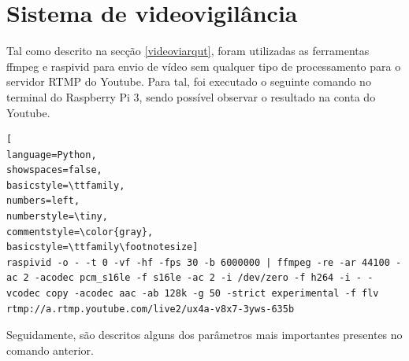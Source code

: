












\section{Sistema de videovigilância}


Tal como descrito na secção \ref{videoviarqut}, foram utilizadas as ferramentas ffmpeg e raspivid para envio de vídeo sem qualquer tipo de processamento para o servidor \ac{RTMP} do Youtube. Para tal, foi executado o seguinte comando no terminal do Raspberry Pi 3, sendo possível observar o resultado na conta do Youtube.


\begin{lstlisting}[
language=Python,
showspaces=false,
basicstyle=\ttfamily,
numbers=left,
numberstyle=\tiny,
commentstyle=\color{gray},
basicstyle=\ttfamily\footnotesize]
raspivid -o - -t 0 -vf -hf -fps 30 -b 6000000 | ffmpeg -re -ar 44100 -ac 2 -acodec pcm_s16le -f s16le -ac 2 -i /dev/zero -f h264 -i - -vcodec copy -acodec aac -ab 128k -g 50 -strict experimental -f flv rtmp://a.rtmp.youtube.com/live2/ux4a-v8x7-3yws-635b

\end{lstlisting}






Seguidamente, são descritos alguns dos parâmetros mais importantes presentes no comando anterior\cite{streamlive}. 

